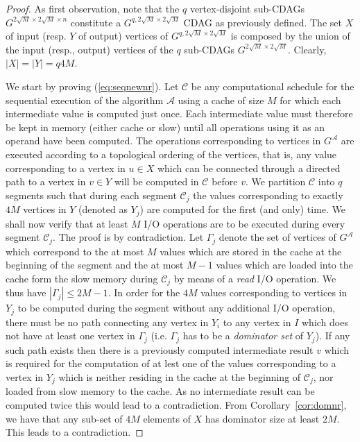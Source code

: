 \documentclass[a4paper,UKenglish]{lipics-v2016}
\newcommand{\io }{I/O }
\newcommand{\alg}{\mathcal{A}}
\begin{document}
\begin{proof}
	As first observation, note that the $q$ vertex-disjoint sub-CDAGs $G^{2\sqrt{M}\times 2\sqrt{M}\times n}$ constitute a $G^{q,2\sqrt{M}\times 2\sqrt{M}}$ CDAG as previously defined. The set $X$ of input (resp. $Y$ of output) vertices of $G^{q,2\sqrt{M}\times 2\sqrt{M}}$ is composed by the union of the input (resp., output) vertices of the $q$ sub-CDAGs $G^{2\sqrt{M}\times 2\sqrt{M}}$. Clearly, $|X|=|Y|=q4M$.
	
	We start by proving (\ref{eq:seqnewnr}). Let $\mathcal{C}$ be any computational schedule for the sequential execution of the algorithm $\alg$ using a cache of size $M$ for which each intermediate value is computed just once. Each intermediate value must therefore be kept in memory (either cache or slow) until all operations using it as an operand have been computed. The operations corresponding to vertices in $G^{\alg}$ are executed according to a topological ordering of the vertices, that is, any value corresponding to a vertex in $u\in X$ which can be connected through a directed path to a vertex in $v\in Y$ will be computed in $\mathcal{C}$ before $v$. We partition $\mathcal{C}$ into $q$ segments such that during each segment $\mathcal{C}_j$ the values corresponding to exactly $4M$ vertices in $Y$ (denoted as $Y_j$) are computed for the first (and only) time.	
	We shall now verify that at least $M$ \io operations are to be executed during every segment $\mathcal{C}_j$. The proof is by contradiction.   
	 Let $\Gamma_j$ denote the set of vertices of $G^{\alg}$ which correspond to the at most $M$ values which are  stored in the cache at the beginning of the segment and the at most $M-1$ values which are loaded into the cache form the slow memory during $\mathcal{C}_j$ by means of a \emph{read} \io operation. We thus have $|\Gamma_j|\leq 2M -1$.
	  In order for the $4M$ values corresponding to vertices in $Y_j$ to be computed during the segment without any additional \io operation, there must be no path connecting any vertex in $Y_i$ to any vertex in $I$ which does not have at least one vertex in $\Gamma_j$ (i.e. $\Gamma_j$ has to be a \emph{dominator set} of $Y_j$). If any such path exists then there is a previously computed intermediate result $v$ which is required for the computation of at lest one of the values corresponding to a vertex in $Y_j$ which is neither residing in the cache at the beginning of $\mathcal{C}_j$, nor loaded from slow memory to the cache. As no intermediate result can be computed twice this would lead to a contradiction.  From Corollary~\ref{cor:domnr}, we have that any sub-set of $4M$ elements of $X$ has dominator size at least $2M$. This leads to a contradiction.
	

\end{proof}
\end{document}
